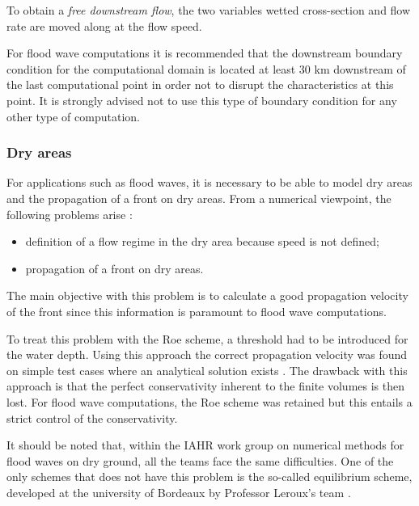\vspace{0.5cm}

To obtain a \textit{free downstream flow}, the two variables wetted cross-section and flow rate are moved along at the flow speed.

\vspace{0.5cm}

For flood wave computations it is recommended that the downstream boundary condition for the computational domain is located at least 30 km downstream of the last computational point in order not to disrupt the characteristics at this point. It is strongly advised not to use this type of boundary condition for any other type of computation.

\subsubsection{Dry areas}

For applications such as flood waves, it is necessary to be able to model dry areas and the propagation of a front on dry areas. From a numerical viewpoint, the following problems arise :
\begin{itemize}
 \item definition of a flow regime in the dry area because speed is not defined;
 \item propagation of a front on dry areas.
\end{itemize}

\vspace{0.5cm}

The main objective with this problem is to calculate a good propagation velocity of the front since this information is paramount to flood wave computations.

\vspace{0.5cm}

To treat this problem with the Roe scheme, a threshold had to be introduced for the water depth. Using this approach the correct propagation velocity was found on simple test cases where an analytical solution exists \cite{GOUTAL97}. The drawback with this approach is that the perfect conservativity inherent to the finite volumes is then lost. For flood wave computations, the Roe scheme was retained but this entails a strict control of the conservativity.

\vspace{0.5cm}

It should be noted that, within the IAHR work group on numerical methods for flood waves on dry ground, all the teams face the same difficulties.
One of the only schemes that does not have this problem is the so-called equilibrium scheme, developed at the university of Bordeaux by Professor Leroux's team \cite{LECOZ96}\cite{BON97}.

